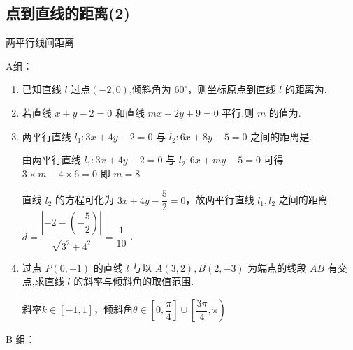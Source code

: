\clearpage
\subsection*{点到直线的距离(2)}

\zsd 两平行线间距离

A组：
\begin{enumerate}
    \item 已知直线 $l$ 过点$(-2,0)$,倾斜角为 ${60}^{ \circ  }$，则坐标原点到直线 $l$ 的距离为.
    
    \item 若直线 $x + y - 2 = 0$ 和直线 ${mx} + {2y} + 9 = 0$ 平行,则 $m$ 的值为.
    
    \item 两平行直线 ${l}_{1} : {3x} + {4y} - 2 = 0$ 与 ${l}_{2} : {6x} + 8y - 5 = 0$ 之间的距离是.
    \begin{jieda}
        由两平行直线 ${l}_{1} : {3x} + {4y} - 2 = 0$ 与 ${l}_{2} : {6x} + {my} - 5 = 0$ 可得$3 \times  m - 4 \times  6 = 0$ 即 $m = 8$ 
        
        直线 ${l}_{2}$ 的方程可化为 ${3x} + {4y} - \dfrac{5}{2} = 0$，故两平行直线 ${l}_{1},{l}_{2}$ 之间的距离 $d = \dfrac{\left| -2 - \left( -\dfrac{5}{2}\right) \right| }{\sqrt{{3}^{2} + {4}^{2}}} = \dfrac{1}{10}$ .
    \end{jieda}

    \item 过点 $P\left( {0, -1}\right)$ 的直线 $l$ 与以 $A\left( {3,2}\right) ,B\left( {2, -3}\right)$ 为端点的线段 ${AB}$ 有交点,求直线 $l$ 的斜率与倾斜角的取值范围.
    \begin{jieda}
        斜率$k \in [-1, 1]$，倾斜角$\theta \in \left[0, \dfrac{\pi}{4}\right] \cup \left[\dfrac{3\pi}{4}, \pi\right)$
    \end{jieda}
\end{enumerate}

B 组：

